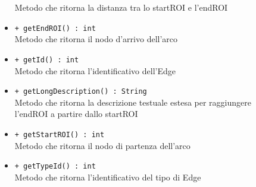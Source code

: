\documentclass[../DefinizioneDiProdotto.tex]{subfiles}
\begin{document}
\begin{description}
\begin{itemize}
		Metodo che ritorna la distanza tra lo startROI e l'endROI
		\item \texttt{+ getEndROI() : int}\\
		Metodo che ritorna il nodo d'arrivo dell'arco
		\item \texttt{+ getId() : int}\\
		Metodo che ritorna l'identificativo dell'Edge
		\item \texttt{+ getLongDescription() : String}\\
		Metodo che ritorna la descrizione testuale estesa per raggiungere l'endROI a partire dallo startROI
		\item \texttt{+ getStartROI() : int}\\
		Metodo che ritorna il nodo di partenza dell'arco
		\item \texttt{+ getTypeId() : int}\\
		Metodo che ritorna l'identificativo del tipo di Edge
	\end{itemize}
\end{description}
\end{document}
